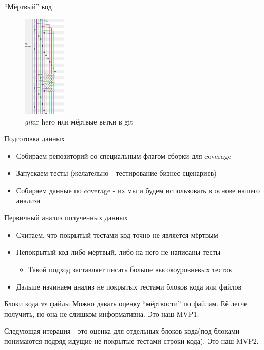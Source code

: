\documentclass[aspectratio=169]{beamer}
\newcommand{\myskip}{\vspace{\baselineskip}}
\begin{document}
\begin{frame}{``Мёртвый'' код}
    \begin{figure}
        \includegraphics[width=0.18\textwidth]{memes/git.png}
        \caption{\textit{git}ar hero или мёртвые ветки в git}
    \end{figure}
\end{frame}

\begin{frame}{ Подготовка данных}
    \begin{itemize}
        \item Собираем репозиторий со специальным флагом сборки для coverage
        \item Запускаем тесты (желательно - тестирование бизнес-сценариев)
        \item Собираем данные по coverage - их мы и будем использовать в основе нашего анализа
    \end{itemize}
\end{frame}

\begin{frame}{Первичный анализ полученных данных}
    \begin{itemize}
        \item Считаем, что покрытый тестами код точно не является мёртвым
        \item Непокрытый код либо мёртвый, либо на него не написаны тесты
              \begin{itemize}
                  \item Такой подход заставляет писать больше высокоуровневых тестов
              \end{itemize}
        \item Дальше начинаем анализ не покрытых тестами блоков кода или файлов
    \end{itemize}
\end{frame}

\begin{frame}{Блоки кода vs файлы}
    Можно давать оценку ``мёртвости'' по файлам. Её легче получить, но она не слишком информативна. Это наш MVP1.

    \myskip
    Следующая итерация - это оценка для отдельных блоков кода(под блоками понимаются подряд идущие не покрытые тестами строки кода). Это наш MVP2.
\end{frame}
\end{document}

